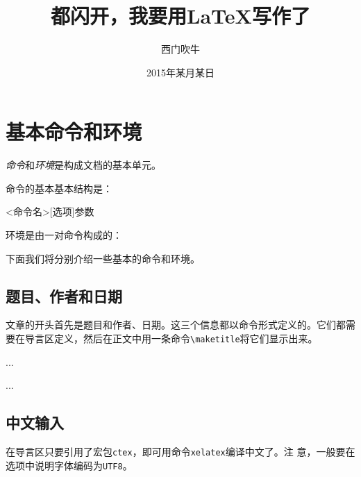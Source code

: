 \section{基本命令和环境}

\emph{命令}和\emph{环境}是构成文档的基本单元。

命令的基本基本结构是：

\begin{code}
  <命令名>[选项]{参数}
\end{code}

环境是由一对命令构成的：
\begin{code}
 \begin{环境名}[选项] 
 \end{环境名}
\end{code}

下面我们将分别介绍一些基本的命令和环境。

\subsection{题目、作者和日期}

文章的开头首先是题目和作者、日期。这三个信息都以命令形式定义的。它们都需
要在导言区定义，然后在正文中用一条命令\verb!\maketitle!将它们显示出来。

\begin{code}
  ...
  \title{都闪开，我要用\LaTeX{}写作了}
  \author{西门吹牛}
  \date{2015年某月某日}
  ...
  
    \maketitle %
  
\end{code}

\subsection{中文输入}

在导言区只要引用了宏包\verb!ctex!，即可用命令\verb!xelatex!编译中文了。注
意，一般要在选项中说明字体编码为\verb!UTF8!。

\begin{code}
  \usepackage[UTF8]{ctex}
\end{code}

